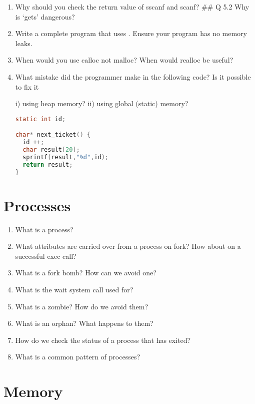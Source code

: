 \begin{enumerate}
\item Why should you check the return value of sscanf and scanf? \#\# Q 5.2 Why is `gets' dangerous?

\item Write a complete program that uses . Ensure your program has no memory leaks.

\item When would you use calloc not malloc? When would realloc be useful?

\item What mistake did the programmer make in the following code? Is it possible to fix it

i) using heap memory?
ii) using global (static) memory?

\begin{lstlisting}[language=C]
static int id;

char* next_ticket() {
  id ++;
  char result[20];
  sprintf(result,"%d",id);
  return result;
}
\end{lstlisting}

\end{enumerate}

\section{Processes}

\begin{enumerate}
\item What is a process?
\item What attributes are carried over from a process on fork? How about on a successful exec call?
\item What is a fork bomb? How can we avoid one?
\item What is the wait system call used for?
\item What is a zombie? How do we avoid them?
\item What is an orphan? What happens to them?
\item How do we check the status of a process that has exited?
\item What is a common pattern of processes?
\end{enumerate}

\section{Memory}

